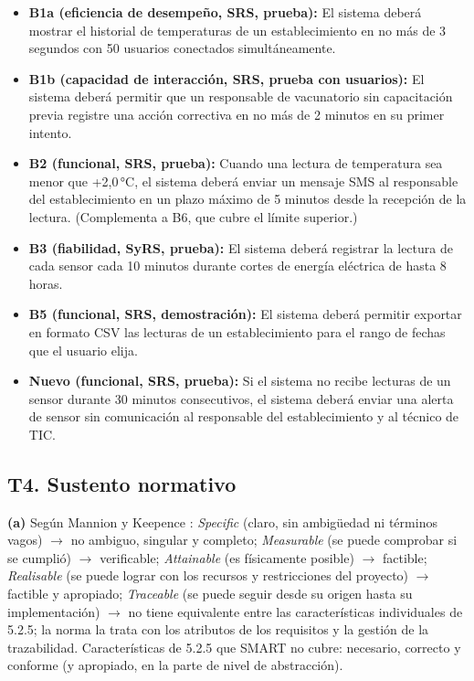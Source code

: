 \documentclass[11pt]{article}
\newcommand{\subseccion}[1]{\subsection{\textcolor{midblue}{#1}}}
\begin{document}
\begin{itemize}[leftmargin=18pt,itemsep=3pt]

	\item \textbf{B1a (eficiencia de desempeño, SRS, prueba):} El sistema deberá mostrar el historial de temperaturas de un establecimiento en no más de 3 segundos con 50 usuarios conectados simultáneamente.

	\item \textbf{B1b (capacidad de interacción, SRS, prueba con usuarios):} El sistema deberá permitir que un responsable de vacunatorio sin capacitación previa registre una acción correctiva en no más de 2 minutos en su primer intento.

	\item \textbf{B2 (funcional, SRS, prueba):} Cuando una lectura de temperatura sea menor que +2,0\,°C, el sistema deberá enviar un mensaje SMS al responsable del establecimiento en un plazo máximo de 5 minutos desde la recepción de la lectura. (Complementa a B6, que cubre el límite superior.)

	\item \textbf{B3 (fiabilidad, SyRS, prueba):} El sistema deberá registrar la lectura de cada sensor cada 10 minutos durante cortes de energía eléctrica de hasta 8 horas.

	\item \textbf{B5 (funcional, SRS, demostración):} El sistema deberá permitir exportar en formato CSV las lecturas de un establecimiento para el rango de fechas que el usuario elija.

	\item \textbf{Nuevo (funcional, SRS, prueba):} Si el sistema no recibe lecturas de un sensor durante 30 minutos consecutivos, el sistema deberá enviar una alerta de sensor sin comunicación al responsable del establecimiento y al técnico de TIC.

\end{itemize}



\subseccion{T4. Sustento normativo}



\textbf{(a)} Según Mannion y Keepence \citep{mannion_smart_1995}: \emph{Specific} (claro, sin ambigüedad ni términos vagos) $\rightarrow$ no ambiguo, singular y completo; \emph{Measurable} (se puede comprobar si se cumplió) $\rightarrow$ verificable; \emph{Attainable} (es físicamente posible) $\rightarrow$ factible; \emph{Realisable} (se puede lograr con los recursos y restricciones del proyecto) $\rightarrow$ factible y apropiado; \emph{Traceable} (se puede seguir desde su origen hasta su implementación) $\rightarrow$ no tiene equivalente entre las características individuales de 5.2.5; la norma la trata con los atributos de los requisitos y la gestión de la trazabilidad. Características de 5.2.5 que SMART no cubre: necesario, correcto y conforme (y apropiado, en la parte de nivel de abstracción).
\end{document}
